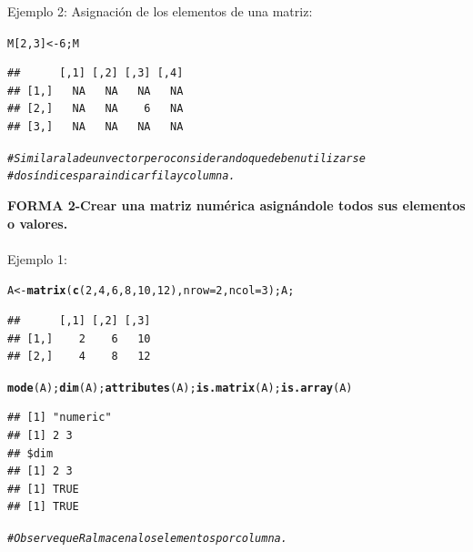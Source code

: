 \documentclass[12pt,letterpaper]{article}\usepackage[]{graphicx}\usepackage[]{color}
\makeatletter
\newcommand{\hlnum}[1]{\textcolor[rgb]{0.686,0.059,0.569}{#1}}%
\newcommand{\hlcom}[1]{\textcolor[rgb]{0.678,0.584,0.686}{\textit{#1}}}%
\newcommand{\hlstd}[1]{\textcolor[rgb]{0.345,0.345,0.345}{#1}}%
\newcommand{\hlkwb}[1]{\textcolor[rgb]{0.69,0.353,0.396}{#1}}%
\newcommand{\hlkwc}[1]{\textcolor[rgb]{0.333,0.667,0.333}{#1}}%
\newcommand{\hlkwd}[1]{\textcolor[rgb]{0.737,0.353,0.396}{\textbf{#1}}}%
\newenvironment{kframe}{%
 \def\at@end@of@kframe{}%
 \ifinner\ifhmode%
  \def\at@end@of@kframe{\end{minipage}}%
  \begin{minipage}{\columnwidth}%
 \fi\fi%
 \def\FrameCommand##1{\hskip\@totalleftmargin \hskip-\fboxsep
 \colorbox{shadecolor}{##1}\hskip-\fboxsep
     \hskip-\linewidth \hskip-\@totalleftmargin \hskip\columnwidth}%
 \MakeFramed {\advance\hsize-\width
   \@totalleftmargin\z@ \linewidth\hsize
   \@setminipage}}%
 {\par\unskip\endMakeFramed%
 \at@end@of@kframe}
\newenvironment{knitrout}{}{} %
\makeatother
\begin{document}
Ejemplo 2: Asignaci\'on de los elementos de una matriz:
\begin{knitrout}
\color{fgcolor}\begin{kframe}
\begin{alltt}
\hlstd{M[}\hlnum{2}\hlstd{,}\hlnum{3}\hlstd{]} \hlkwb{<-} \hlnum{6}\hlstd{; M}
\end{alltt}
\begin{verbatim}
##      [,1] [,2] [,3] [,4]
## [1,]   NA   NA   NA   NA
## [2,]   NA   NA    6   NA
## [3,]   NA   NA   NA   NA
\end{verbatim}
\begin{alltt}
\hlcom{# Similar a la de un vector pero considerando que deben utilizarse }
\hlcom{#dos índicespara indicar fila y columna.}
\end{alltt}
\end{kframe}
\end{knitrout}

\textbf{FORMA 2-Crear una matriz num\'erica asign\'andole todos sus elementos o valores.}\\

\\ Ejemplo 1:
\begin{knitrout}
\color{fgcolor}\begin{kframe}
\begin{alltt}
\hlstd{A} \hlkwb{<-} \hlkwd{matrix}\hlstd{(}\hlkwd{c}\hlstd{(}\hlnum{2}\hlstd{,} \hlnum{4}\hlstd{,} \hlnum{6}\hlstd{,} \hlnum{8}\hlstd{,} \hlnum{10}\hlstd{,} \hlnum{12}\hlstd{),} \hlkwc{nrow}\hlstd{=}\hlnum{2}\hlstd{,} \hlkwc{ncol}\hlstd{=}\hlnum{3}\hlstd{); A;}
\end{alltt}
\begin{verbatim}
##      [,1] [,2] [,3]
## [1,]    2    6   10
## [2,]    4    8   12
\end{verbatim}
\begin{alltt}
\hlkwd{mode}\hlstd{(A);} \hlkwd{dim}\hlstd{(A);} \hlkwd{attributes}\hlstd{(A);} \hlkwd{is.matrix}\hlstd{(A);} \hlkwd{is.array}\hlstd{(A)}
\end{alltt}
\begin{verbatim}
## [1] "numeric"
## [1] 2 3
## $dim
## [1] 2 3
## [1] TRUE
## [1] TRUE
\end{verbatim}
\begin{alltt}
\hlcom{#Observe que R almacena los elementos por columna.  }
\end{alltt}
\end{kframe}
\end{knitrout}
\end{document}
